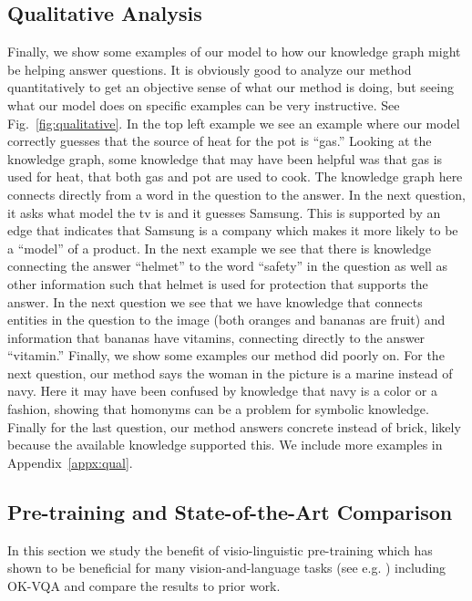 \documentclass[final]{cvpr}
\providecommand{\sectionvspace}{\vspace{-0cm}}
\begin{document}
\subsection{Qualitative Analysis}
\label{sec:qualitative}
\sectionvspace
Finally, we show some examples of our model to how our knowledge graph might be helping answer questions. It is obviously good to analyze our method quantitatively to get an objective sense of what our method is doing, but seeing what our model does on specific examples can be very instructive. See Fig.~\ref{fig:qualitative}. In the top left example we see an example where our model correctly guesses that the source of heat for the pot is ``gas.'' 
Looking at the knowledge graph, some knowledge that may have been helpful was that gas is used for heat, that both gas and pot are used to cook. The knowledge graph here connects directly from a word in the question to the answer. In the next question, it asks what model the tv is and it guesses Samsung. This is supported by an edge that indicates that Samsung is a company which makes it more likely to be a ``model'' of a product. 
In the next example we see that there is knowledge connecting the answer ``helmet'' to the word ``safety'' in the question as well as other information such that helmet is used for protection that supports the answer. 
In the next question we see that we have knowledge that connects entities in the question to the image (both oranges and bananas are fruit) and information that bananas have vitamins, connecting directly to the answer ``vitamin.''
Finally, we show some examples our method did poorly on. For the next question, our method says the woman in the picture is a marine instead of navy. Here it may have been confused by knowledge that navy is a color or a fashion, showing that homonyms can be a problem for symbolic knowledge. Finally for the last question, our method answers concrete instead of brick, likely because the available knowledge supported this. 
We include more examples in Appendix~\ref{appx:qual}.

\sectionvspace
\subsection{Pre-training and State-of-the-Art Comparison}
\label{sec:soa}
\sectionvspace
In this section we study the benefit of visio-linguistic pre-training which has shown to be beneficial for many vision-and-language tasks (see e.g. \cite{lu19vilbert,li2019visualbert}) including OK-VQA \cite{garderes2020conceptbert} and compare the results to prior work.
\end{document}
